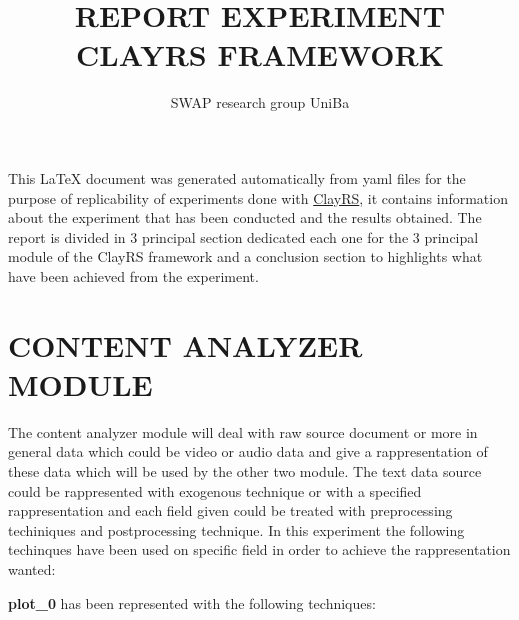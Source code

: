 \documentclass[11pt]{article}
\title{REPORT EXPERIMENT CLAYRS FRAMEWORK}
\author{SWAP research group UniBa}
\begin{document}
\maketitle
This \LaTeX{} document was generated automatically from yaml files for the purpose of replicability of experiments done with
\href{https://github.com/swapUniba/ClayRS}{ClayRS},
it contains information about the experiment that has been conducted and the results obtained.
The report is divided in 3 principal section dedicated each one for the 3 principal module of the ClayRS framework
and a conclusion section to highlights what have been achieved from the experiment.
\hfill\break
\hfill\break



\section{CONTENT ANALYZER MODULE}\label{sec:ca}
The content analyzer module will deal with raw source document or more in general data which could be
video or audio data and give a rappresentation of these data which will be used by the other two module.
The text data source could be rappresented with exogenous technique or with a specified rappresentation
and each field given could be treated with preprocessing techiniques and postprocessing technique. In
this experiment the following techinques have been used on specific field in order to achieve the
rappresentation wanted:
\hfill\break
\hfill\break



\textbf{plot_0} has been represented with the following techniques:
\hfill\break
\hfill\break
\end{document}

